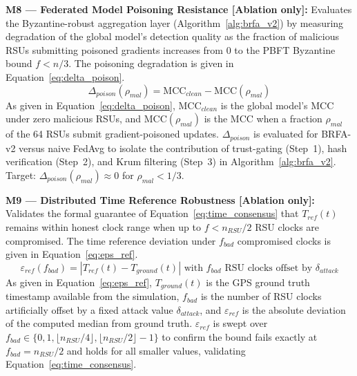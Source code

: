 \documentclass[12pt, a4paper]{report}
\begin{document}
{{\textbf{M8 — Federated Model Poisoning Resistance
[Ablation only]:}
Evaluates the Byzantine-robust aggregation layer
(Algorithm~\ref{alg:brfa_v2}) by measuring
degradation of the global model's detection
quality as the fraction of malicious RSUs
submitting poisoned gradients increases from 0
to the PBFT Byzantine bound $f < n/3$.
The poisoning degradation is given in
Equation~\eqref{eq:delta_poison}.
\begin{equation}
\Delta_{poison}(\rho_{mal}) =
\text{MCC}_{clean} -
\text{MCC}(\rho_{mal})
\label{eq:delta_poison}
\end{equation}
As given in Equation~\eqref{eq:delta_poison},
$\text{MCC}_{clean}$ is the global model's MCC
under zero malicious RSUs, and
$\text{MCC}(\rho_{mal})$ is the MCC when a
fraction $\rho_{mal}$ of the 64 RSUs submit
gradient-poisoned updates. $\Delta_{poison}$
is evaluated for BRFA-v2 versus naive FedAvg to
isolate the contribution of trust-gating
(Step~1), hash verification (Step~2), and Krum
filtering (Step~3) in Algorithm~\ref{alg:brfa_v2}.
Target: $\Delta_{poison}(\rho_{mal}) \approx 0$
for $\rho_{mal} < 1/3$.



\textbf{M9 — Distributed Time Reference Robustness
[Ablation only]:}
Validates the formal guarantee of
Equation~\eqref{eq:time_consensus} that $T_{ref}(t)$
remains within honest clock range when up to
$f < n_{RSU}/2$ RSU clocks are compromised.
The time reference deviation under $f_{bad}$
compromised clocks is given in
Equation~\eqref{eq:eps_ref}.
\begin{equation}
\varepsilon_{ref}(f_{bad}) =
\left|
T_{ref}(t) - T_{ground}(t)
\right|
\text{ with } f_{bad}
\text{ RSU clocks offset by } \delta_{attack}
\label{eq:eps_ref}
\end{equation}
As given in Equation~\eqref{eq:eps_ref},
$T_{ground}(t)$ is the \ac{GPS} ground truth
timestamp available from the simulation,
$f_{bad}$ is the number of RSU clocks
artificially offset by a fixed attack value
$\delta_{attack}$, and $\varepsilon_{ref}$
is the absolute deviation of the computed
median from ground truth. $\varepsilon_{ref}$
is swept over $f_{bad} \in \{0, 1,
\lfloor n_{RSU}/4 \rfloor,
\lfloor n_{RSU}/2 \rfloor - 1\}$ to
confirm the bound fails exactly at
$f_{bad} = n_{RSU}/2$ and holds for all
smaller values, validating
Equation~\eqref{eq:time_consensus}.


}}
\end{document}
